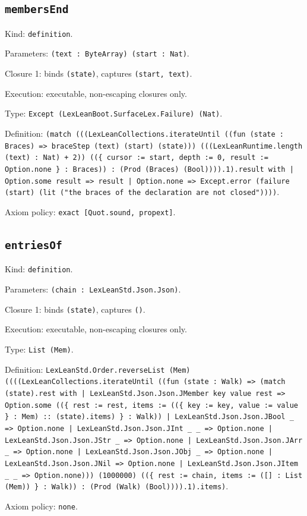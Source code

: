 \documentclass[11pt]{article}
\begin{document}
\subsection*{\texttt{membersEnd}}
\noindent Kind: \texttt{definition}.\par
\noindent Parameters: \texttt{(text : ByteArray) (start : Nat)}.\par
\noindent Closure 1: binds \texttt{(state)}, captures \texttt{(start, text)}.\par
\noindent Execution: executable, non-escaping closures only.\par
\noindent Type: \texttt{Except (LexLeanBoot.SurfaceLex.Failure) (Nat)}.\par
\noindent Definition: \texttt{(match (((LexLeanCollections.iterateUntil ((fun (state : Braces) => braceStep (text) (start) (state))) (((LexLeanRuntime.length (text) : Nat) + 2)) ((\{ cursor := start, depth := 0, result := Option.none \} : Braces)) : (Prod (Braces) (Bool)))).1).result with | Option.some result => result | Option.none => Except.error (failure (start) (lit ("the braces of the declaration are not closed"))))}.\par
\noindent Axiom policy: \texttt{exact [Quot.sound, propext]}.\par
\subsection*{\texttt{entriesOf}}
\noindent Kind: \texttt{definition}.\par
\noindent Parameters: \texttt{(chain : LexLeanStd.Json.Json)}.\par
\noindent Closure 1: binds \texttt{(state)}, captures \texttt{()}.\par
\noindent Execution: executable, non-escaping closures only.\par
\noindent Type: \texttt{List (Mem)}.\par
\noindent Definition: \texttt{LexLeanStd.Order.reverseList (Mem) ((((LexLeanCollections.iterateUntil ((fun (state : Walk) => (match (state).rest with | LexLeanStd.Json.Json.JMember key value rest => Option.some ((\{ rest := rest, items := ((\{ key := key, value := value \} : Mem) :: (state).items) \} : Walk)) | LexLeanStd.Json.Json.JBool \_ => Option.none | LexLeanStd.Json.Json.JInt \_ \_ => Option.none | LexLeanStd.Json.Json.JStr \_ => Option.none | LexLeanStd.Json.Json.JArr \_ => Option.none | LexLeanStd.Json.Json.JObj \_ => Option.none | LexLeanStd.Json.Json.JNil => Option.none | LexLeanStd.Json.Json.JItem \_ \_ => Option.none))) (1000000) ((\{ rest := chain, items := ([] : List (Mem)) \} : Walk)) : (Prod (Walk) (Bool)))).1).items)}.\par
\noindent Axiom policy: \texttt{none}.\par
\end{document}
